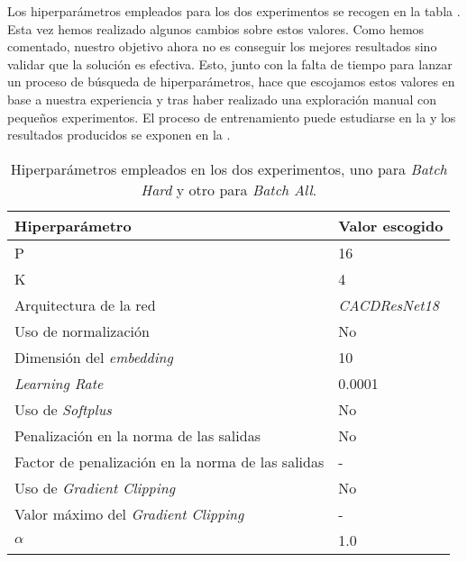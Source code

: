 Los hiperparámetros empleados para los dos experimentos se recogen en la tabla . Esta vez hemos realizado algunos cambios sobre estos valores. Como hemos comentado, nuestro objetivo ahora no es conseguir los mejores resultados sino validar que la solución es efectiva. Esto, junto con la falta de tiempo para lanzar un proceso de búsqueda de hiperparámetros, hace que escojamos estos valores en base a nuestra experiencia y tras haber realizado una exploración manual con pequeños experimentos. El proceso de entrenamiento puede estudiarse en la  y los resultados producidos se exponen en la .

\begin{table}[!hbt]
    \centering
    \begin{tabular}{|l|l|}
        \hline
        Hiperparámetro                                    & Valor escogido        \\
        \hline
        P                                                 & 16                    \\
        K                                                 & 4                     \\
        Arquitectura de la red                            & \textit{CACDResNet18} \\
        Uso de normalización                              & No                    \\
        Dimensión del \textit{embedding}                  & 10                    \\
        \textit{Learning Rate}                            & 0.0001                \\
        Uso de \textit{Softplus}                          & No                    \\
        Penalización en la norma de las salidas           & No                    \\
        Factor de penalización en la norma de las salidas & -                     \\
        Uso de \textit{Gradient Clipping}                 & No                    \\
        Valor máximo del \textit{Gradient Clipping}       & -                     \\
        $\alpha$                                          & 1.0                   \\

        \hline
    \end{tabular}
    \caption{Hiperparámetros empleados en los dos experimentos, uno para \textit{Batch Hard} y otro para \textit{Batch All}.}
    \label{table:hp_cacd_corregido}
\end{table}

